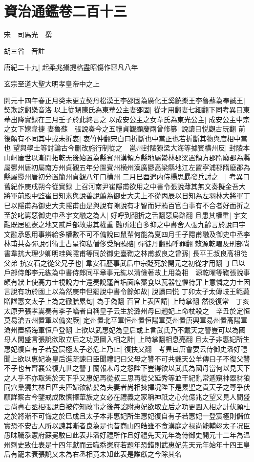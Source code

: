 \chapter{資治通鑑卷二百十三}
宋　司馬光　撰

胡三省　音註

唐紀二十九|{
	起柔兆攝提格盡昭傷作噩凡八年}


玄宗至道大聖大明孝皇帝中之上

開元十四年春正月癸未更立契丹松漠王李邵固為廣化王奚饒樂王李魯蘇為奉誠王|{
	契欺訖翻樂音洛}
以上從甥陳氏為東華公主妻邵固|{
	從才用翻妻七細翻下同考異曰東華出降實録在三月壬子於此終言之}
以成安公主之女韋氏為東光公主|{
	成安公主中宗之女下嫁韋捷}
妻魯蘇　張說奏今之五禮貞觀顯慶兩曾修纂|{
	說讀曰悦觀古玩翻}
前後頗有不同其中或未折衷|{
	衷竹仲翻宋白曰折斷也中當正也若折斷其物與度相中當也}
望與學士等討論古今删改施行制從之　邕州封陵獠梁大海等據賓横州反|{
	封陵本山峒唐世以漸開拓乾无後始置為縣賓州漢領方縣地屬鬱林郡梁置領方郡隋廢郡為縣屬鬰州唐初屬南方州貞觀五年分置賓州横州漢廣鬰高梁縣地江左置寜浦郡隋廢郡為縣屬鬰州唐初分置簡州貞觀八年曰横州}
二月巳酉遣内侍楊思勗發兵討之　|{
	考異曰舊紀作庚戌朔今從實録}
上召河南尹崔隱甫欲用之中書令張說薄其無文奏擬金吾大將軍前殿中監崔日知素與說善說薦為御史大夫上不從丙辰以日知為左羽林大將軍丁巳以隱甫為御史大夫隱甫由是與說有隙說有才智而好賄百官白事有不合者好面折之至於叱罵惡御史中丞宇文融之為人|{
	好呼到翻折之舌翻惡烏路翻}
且患其權重|{
	宇文融既居風憲之地又貳戶部故患其權重}
融所建白多抑之中書舍人張九齡言於說曰宇文融承恩用事辨給多權數不可不備說曰鼠輩何能為夏四月壬子隱甫融及御史中丞李林甫共奏彈說引術士占星徇私僭侈受納賄賂|{
	彈徒丹翻賄呼罪翻}
敕源乾曜及刑部尚書韋抗大理少卿明珪與隱甫等同於御史臺鞫之林甫叔良之曾孫|{
	長平王叔良高祖從父弟}
抗安石之從父兄子也|{
	韋安石歷事武后中宗貶死於開元之初從才用翻}
丁巳以戶部侍郎李元紘為中書侍郎同平章事元紘以清儉著故上用為相　源乾曜等鞫張說事頗有狀上使高力士視說力士還奏說蓬首垢面席藁食以瓦器惶懼待罪上意憐之力士因言說有功於國上以為然庚申但罷說中書令餘如故|{
	說讀曰悦}
丁卯太子太傳岐王範薨贈諡惠文太子上為之徹膳累旬|{
	為于偽翻}
百官上表固請|{
	上時掌翻}
然後復常　丁亥太原尹張孝嵩奏有李子嶠者自稱皇子云生於潞州母曰趙妃上命杖殺之　辛丑於定恒莫易滄五州置軍以備突厥|{
	定州置北平軍恒州置恒陽軍莫州置唐興軍易州置高陽軍滄州置横海軍恒戶登翻}
上欲以武惠妃為皇后或上言武氏乃不戴天之讐豈可以為國母人間盛言張說欲取立后之功更圖入相之計|{
	上時掌翻相息亮翻}
且太子非惠妃所生惠妃復自有子若登宸極太子必危上乃止|{
	復扶又翻　考異曰唐會要云侍御史潘好禮聞上欲以惠妃為皇后進疏諫曰臣聞禮記曰父母之讐不可共戴天公羊傳曰子不復父讐不子也昔齊襄公復九世之讐丁蘭報木母之怨陛下豈得欲以武氏為國母當何以見天下之人乎不亦取笑於天下乎又惠妃再從叔三思再從父延秀等並干紀亂常遞窺神器豺狼同穴梟獍共林且匹夫匹婦欲結髪為夫妻者尚相揀擇况陛下是累聖之貴天子之尊乎伏願詳察古今鑒戒成敗慎擇華族之女必在禮義之家稱神祇之心允億兆之望又見人間盛言尚書右丞相張說自被停知政事之後每諂附惠妃欲取立后之功更圖入相之計伏願杜之於將漸不可悔之於巳成且太子本非惠妃所生惠妃復自有子若惠妃一登宸極則儲位實恐不安古人所以諫其漸者良為是也昔商山四皓雖不食漢庭之禄尚能輔翊太子况臣愚昧職忝憲府蘇冕駮曰此表非潘好禮所作且好禮先天元年為侍御史開元十二年為温州刺史致仕表是十四年獻而云職忝憲府若題年恐錯則武惠妃先天元年始年十四王皇后有寵未衰張說又未為右丞相竟未知此表是誰獻之今除其名}
